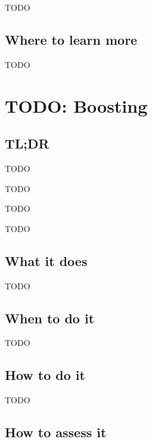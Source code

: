 \documentclass[
]{book}
\providecommand{\tightlist}{%
  \setlength{\itemsep}{0pt}\setlength{\parskip}{0pt}}
\begin{document}
TODO

\hypertarget{where-to-learn-more-16}{%
\section{Where to learn more}\label{where-to-learn-more-16}}

TODO

\hypertarget{boosting}{%
\chapter{TODO: Boosting}\label{boosting}}

\hypertarget{tldr-17}{%
\section{TL;DR}\label{tldr-17}}

\begin{description}
\tightlist
\item[What it does]
TODO
\item[When to do it]
TODO
\item[How to do it]
TODO
\item[How to assess it]
TODO
\end{description}

\hypertarget{what-it-does-17}{%
\section{What it does}\label{what-it-does-17}}

TODO

\hypertarget{when-to-do-it-17}{%
\section{When to do it}\label{when-to-do-it-17}}

TODO

\hypertarget{how-to-do-it-17}{%
\section{How to do it}\label{how-to-do-it-17}}

TODO

\hypertarget{how-to-assess-it-17}{%
\section{How to assess it}\label{how-to-assess-it-17}}
\end{document}

